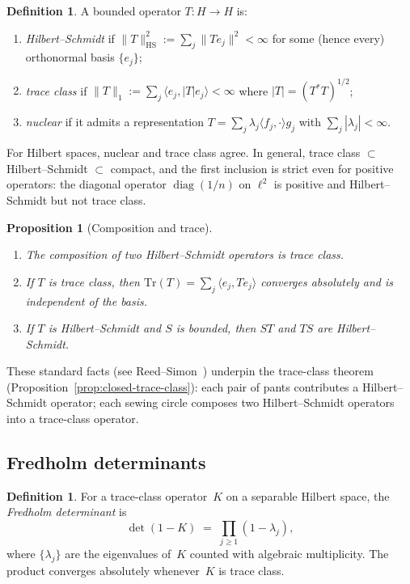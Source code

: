 \documentclass[11pt,reqno]{amsart}
\newtheorem{proposition}[theorem]{Proposition}
\theoremstyle{definition}
\newtheorem{definition}[theorem]{Definition}
\theoremstyle{remark}
\newcommand{\HS}{\mathrm{HS}}
\newcommand{\Tr}{\mathrm{Tr}}
\numberwithin{equation}{section}
\begin{document}
\begin{definition}\label{def:trace-class}
A bounded operator $T \colon H \to H$ is:
\begin{enumerate}[label=\textup{(\alph*)}]
\item \emph{Hilbert--Schmidt} if
 $\|T\|_{\HS}^2 := \sum_j \|Te_j\|^2 < \infty$
 for some (hence every) orthonormal basis $\{e_j\}$;
\item \emph{trace class} if
 $\|T\|_1 := \sum_j \langle e_j, |T| e_j\rangle < \infty$
 where $|T| = (T^*T)^{1/2}$;
\item \emph{nuclear} if it admits a representation
 $T = \sum_j \lambda_j \langle f_j, \cdot\rangle g_j$
 with $\sum_j |\lambda_j| < \infty$.
\end{enumerate}
For Hilbert spaces, nuclear and trace class agree.  In general,
trace class $\subset$ Hilbert--Schmidt $\subset$ compact, and the
first inclusion is strict even for positive operators: the diagonal
operator $\operatorname{diag}(1/n)$ on $\ell^2$ is positive and
Hilbert--Schmidt but not trace class.
\end{definition}

\begin{proposition}[Composition and trace]
\label{prop:hs-composition}
\mbox{}
\begin{enumerate}[label=\textup{(\roman*)}]
\item The composition of two Hilbert--Schmidt operators is
 trace class.
\item If $T$ is trace class, then
 $\Tr(T) = \sum_j \langle e_j, Te_j\rangle$ converges
 absolutely and is independent of the basis.
\item If $T$ is Hilbert--Schmidt and $S$ is bounded, then
 $ST$ and $TS$ are Hilbert--Schmidt.
\end{enumerate}
\end{proposition}

These standard facts (see Reed--Simon~\cite{RS72}) underpin
the trace-class theorem
(Proposition~\ref{prop:closed-trace-class}): each pair of
pants contributes a Hilbert--Schmidt operator; each sewing
circle composes two Hilbert--Schmidt operators into a
trace-class operator.

\subsection{Fredholm determinants}\label{app:fredholm}

\begin{definition}\label{def:fredholm-det}
For a trace-class operator~$K$ on a separable Hilbert space,
the \emph{Fredholm determinant} is
\[
\det(1 - K)
\;=\;
\prod_{j \geq 1}(1 - \lambda_j),
\]
where $\{\lambda_j\}$ are the eigenvalues of~$K$ counted with
algebraic multiplicity.  The product converges absolutely
whenever~$K$ is trace class.
\end{definition}
\end{document}

